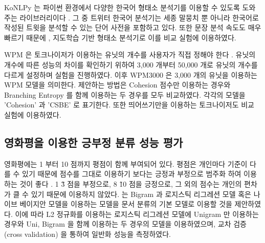 \documentclass[oneside, ko,phd]{snuthesis_utf8_kor}
\begin{document}
KoNLPy 는 파이썬 환경에서 다양한 한국어 형태소 분석기를 이용할 수 있도록 도와주는 라이브러리이다 \cite{konlpy}.
그 중 트위터 한국어 분석기는 세종 말뭉치 뿐 아니라 한국어로 작성된 트윗을 분석할 수 있는 단어 사전을 포함하고 있다.
또한 문장 분석 속도도 매우 빠르기 때문에 \cite{konlpy}, 지도학습 기반 형태소 분석기로 이를 비교 실험에 이용하였다.

WPM 은 토크나이저가 이용하는 유닛의 개수를 사용자가 직접 정해야 한다 \cite{wu2016google}.
유닛의 개수에 따른 성능의 차이를 확인하기 위하여 3,000 개부터 50,000 개로 유닛의 개수를 다르게 설정하며 실험을 진행하였다.
이후 WPM3000 은 3,000 개의 유닛을 이용하는 WPM 모델을 의미한다.
제안하는 방법은 Cohesion 점수만 이용하는 경우와 Branching Entropy 를 함께 이용하는 두 경우를 모두 비교하였다.
각각의 모델을 'Cohesion' 과 'CSBE' 로 표기한다.
또한 띄어쓰기만을 이용하는 토크나이저도 비교 실험에 이용하였다.

\subsection{영화평을 이용한 긍부정 분류 성능 평가}
영화평에는 1 부터 10 점까지 평점이 함께 부여되어 있다.
평점은 개인마다 기준이 다를 수 있기 때문에 점수를 그대로 이용하기 보다는 긍정과 부정으로 범주화 하여 이용하는 것이 좋다 \cite{pang2008opinion, pang2002thumbs}.
1 \~ 3 점을 부정으로, 8 \~ 10 점을 긍정으로, 그 외의 점수는 개인의 편차가 클 수 있기 때문에 이용하지 않았다.
\cite{wang2012baselines, joulin2016bag} 는 Bigram 과 로지스틱 리그레션 모델 혹은 나이브 베이지안 모델을 이용하는 모델을 문서 분류의 기본 모델로 이용할 것을 제안하였다.
이에 따라 L2 정규화를 이용하는 로지스틱 리그레션 모델에 Unigram 만 이용하는 경우와 Uni, Bigram 을 함께 이용하는 두 경우의 모델을 이용하였으며, 교차 검증 (cross validation) 을 통하여 일반화 성능을 측정하였다.
\end{document}
